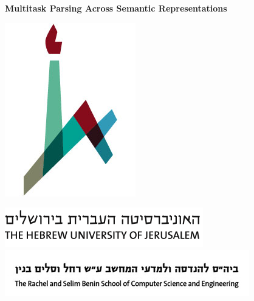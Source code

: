 \documentclass[a0,portrait]{a0poster}
\begin{document}
\begin{center}
	\veryHuge \color{NavyBlue} \textbf{Multitask Parsing Across Semantic Representations}
\end{center}
\vspace{-1cm}
\begin{minipage}[b]{.07\linewidth}
\includegraphics[width=\linewidth]{huji_logo.jpg}
\vspace{5mm}
\end{minipage}
\begin{minipage}[b]{.16\linewidth}
\includegraphics[width=\linewidth]{huji_banner.png}
\includegraphics[width=\linewidth]{cse_banner.jpg}
\vspace{.8mm}
\end{minipage}
\end{document}
